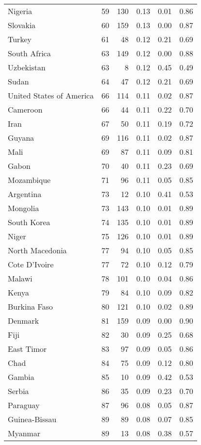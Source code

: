 \begin{longtable}[t]{lrrrrr}
Nigeria & 59 & 130 & 0.13 & 0.01 & 0.86\\
Slovakia & 60 & 159 & 0.13 & 0.00 & 0.87\\
\addlinespace
Turkey & 61 & 48 & 0.12 & 0.21 & 0.69\\
South Africa & 63 & 149 & 0.12 & 0.00 & 0.88\\
Uzbekistan & 63 & 8 & 0.12 & 0.45 & 0.49\\
Sudan & 64 & 47 & 0.12 & 0.21 & 0.69\\
United States of America & 66 & 114 & 0.11 & 0.02 & 0.87\\
\addlinespace
Cameroon & 66 & 44 & 0.11 & 0.22 & 0.70\\
Iran & 67 & 50 & 0.11 & 0.19 & 0.72\\
Guyana & 69 & 116 & 0.11 & 0.02 & 0.87\\
Mali & 69 & 87 & 0.11 & 0.09 & 0.81\\
Gabon & 70 & 40 & 0.11 & 0.23 & 0.69\\
\addlinespace
Mozambique & 71 & 96 & 0.11 & 0.05 & 0.85\\
Argentina & 73 & 12 & 0.10 & 0.41 & 0.53\\
Mongolia & 73 & 143 & 0.10 & 0.01 & 0.89\\
South Korea & 74 & 135 & 0.10 & 0.01 & 0.89\\
Niger & 75 & 126 & 0.10 & 0.01 & 0.89\\
\addlinespace
North Macedonia & 77 & 94 & 0.10 & 0.05 & 0.85\\
Cote D'Ivoire & 77 & 72 & 0.10 & 0.12 & 0.79\\
Malawi & 78 & 101 & 0.10 & 0.04 & 0.86\\
Kenya & 79 & 84 & 0.10 & 0.09 & 0.82\\
Burkina Faso & 80 & 121 & 0.10 & 0.02 & 0.89\\
\addlinespace
Denmark & 81 & 159 & 0.09 & 0.00 & 0.90\\
Fiji & 82 & 30 & 0.09 & 0.25 & 0.68\\
East Timor & 83 & 97 & 0.09 & 0.05 & 0.86\\
Chad & 84 & 75 & 0.09 & 0.12 & 0.80\\
Gambia & 85 & 10 & 0.09 & 0.42 & 0.53\\
\addlinespace
Serbia & 86 & 35 & 0.09 & 0.23 & 0.70\\
Paraguay & 87 & 96 & 0.08 & 0.05 & 0.87\\
Guinea-Bissau & 89 & 89 & 0.08 & 0.07 & 0.85\\
Myanmar & 89 & 13 & 0.08 & 0.38 & 0.57\\

\end{longtable}
